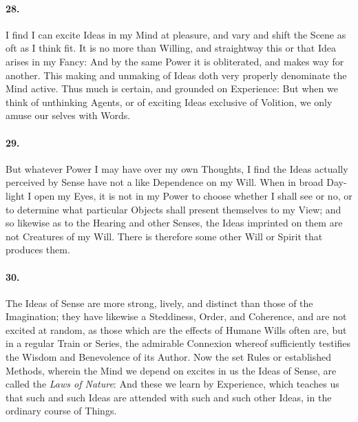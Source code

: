 \documentclass[]{article}
\newenvironment{sectionbody}{}{}
\begin{document}
\begin{sectionbody}
\paragraph{28.} I find I can excite Ideas in my Mind at pleasure, and vary and
shift the Scene as oft as I think fit.  It is no more than
Willing, and straightway this or that Idea arises in my Fancy:
And by the same Power it is obliterated, and makes way for
another.  This making and unmaking of Ideas doth very properly
denominate the Mind active.  Thus much is certain, and grounded
on Experience: But when we think of unthinking Agents, or of
exciting Ideas exclusive of Volition, we only amuse our selves
with Words.



\paragraph{29.} But whatever Power I may have over my own Thoughts, I find the
Ideas actually perceived by Sense have not a like Dependence on
my Will.  When in broad Day-light I open my Eyes, it is not in my
Power to choose whether I shall see or no, or to determine what
particular Objects shall present themselves to my View; and so
likewise as to the Hearing and other Senses, the Ideas imprinted
on them are not Creatures of my Will.  There is therefore some
other Will or Spirit that produces them.



\paragraph{30.} The Ideas of Sense are more strong, lively, and distinct than
those of the Imagination; they have likewise a Steddiness, Order,
and Coherence, and are not excited at random, as those which are
the effects of Humane Wills often are, but in a regular Train or
Series, the admirable Connexion whereof sufficiently testifies
the Wisdom and Benevolence of its Author.  Now the set Rules or
established Methods, wherein the Mind we depend on excites in us
the Ideas of Sense, are called the \emph{Laws of Nature}: And
these we learn by Experience, which teaches us that such and such
Ideas are attended with such and such other Ideas, in the
ordinary course of Things.




\end{sectionbody}
\end{document}
